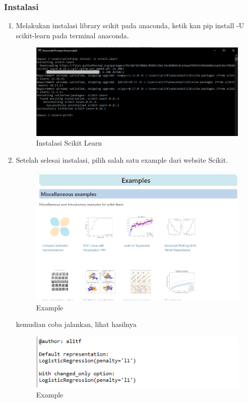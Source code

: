 	\subsubsection{Instalasi}
	\begin{enumerate}
		\item Melakukan instalasi library scikit pada anaconda, ketik kan pip install -U scikit-learn pada terminal anaconda. 

		\begin{figure}[H]
		\centering
		\includegraphics[width=1\textwidth]{figures/1174057/chapter1/1.png}
		\caption{Instalasi Scikit Learn}
		\label{print}
		\end{figure}

		\item Setelah selesai instalasi, pilih salah satu example dari website Scikit. 
		\begin{figure}[H]
		\centering
		\includegraphics[width=1\textwidth]{figures/1174057/chapter1/2.png}
		\caption{Example}
		\label{print}
		\end{figure}

		
		\par kemudian coba jalankan, lihat hasilnya
		\begin{figure}[H]
		\centering
		\includegraphics[width=1.5\textwidth]{figures/1174057/chapter1/3.png}
		\caption{Example}
		\label{print}
		\end{figure}


\end{enumerate}
